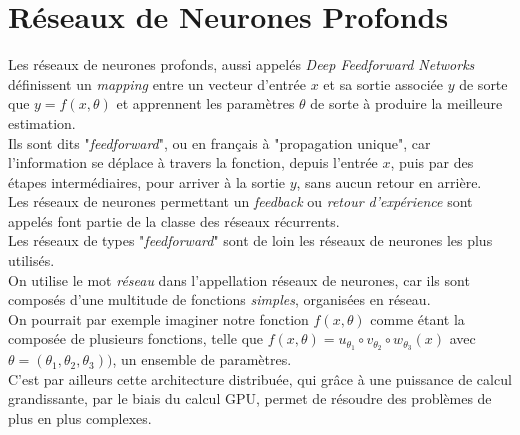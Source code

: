 \documentclass[10pt,a4paper]{report}
\begin{document}
	\section{Réseaux de Neurones Profonds}
	Les réseaux de neurones profonds, aussi appelés \emph{Deep Feedforward Networks} définissent un \emph{mapping} entre un vecteur d'entrée $x$ et sa sortie associée $y$ de sorte que $y = f(x,\theta)$ et apprennent les paramètres $\theta$ de sorte à produire la meilleure estimation.\\
	Ils sont dits "\emph{feedforward}", ou en français à "propagation unique", car l'information se déplace à travers la fonction, depuis l'entrée $x$, puis par des étapes intermédiaires, pour arriver à la sortie $y$, sans aucun retour en arrière.\\
	Les réseaux de neurones permettant un \emph{feedback} ou \emph{retour d'expérience} sont appelés font partie de la classe des réseaux récurrents.\\
	Les réseaux de types "\emph{feedforward}" sont de loin les réseaux de neurones les plus utilisés.\\
	On utilise le mot \emph{réseau} dans l’appellation réseaux de neurones, car ils sont composés d'une multitude de fonctions \emph{simples}, organisées en réseau.\\
	On pourrait par exemple imaginer notre fonction $f(x,\theta)$ comme étant la composée de plusieurs fonctions, telle que $f(x,\theta) = u_{\theta_1} \circ v_{\theta_2} \circ w_{\theta_3}(x)$ avec $\theta = (\theta_1,\theta_2, \theta_3))$, un ensemble de paramètres.\\
	C'est par ailleurs cette architecture distribuée, qui grâce à une puissance de calcul grandissante, par le biais du calcul GPU, permet de résoudre des problèmes de plus en plus complexes.
\end{document}
